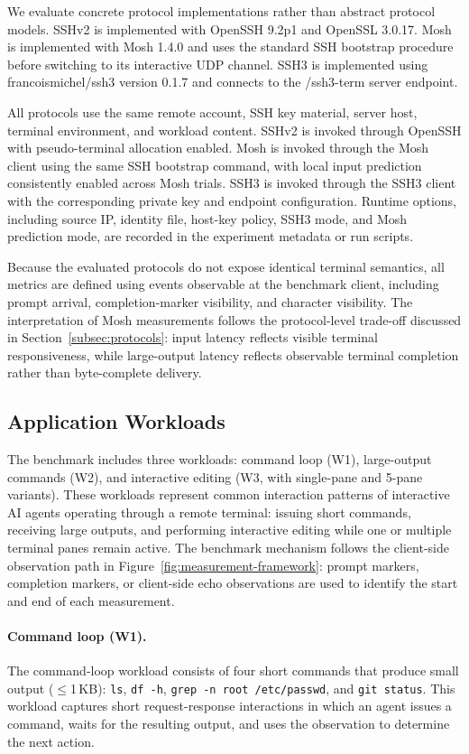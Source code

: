 We evaluate concrete protocol implementations rather than abstract protocol models. SSHv2 is implemented with OpenSSH 9.2p1 and OpenSSL 3.0.17. Mosh is implemented with Mosh 1.4.0 and uses the standard SSH bootstrap procedure before switching to its interactive UDP channel. SSH3 is implemented using francoismichel/ssh3 version 0.1.7 and connects to the /ssh3-term server endpoint.

All protocols use the same remote account, SSH key material, server host, terminal environment, and workload content. SSHv2 is invoked through OpenSSH with pseudo-terminal allocation enabled. Mosh is invoked through the Mosh client using the same SSH bootstrap command, with local input prediction consistently enabled across Mosh trials. SSH3 is invoked through the SSH3 client with the corresponding private key and endpoint configuration. Runtime options, including source IP, identity file, host-key policy, SSH3 mode, and Mosh prediction mode, are recorded in the experiment metadata or run scripts.

Because the evaluated protocols do not expose identical terminal semantics, all metrics are defined using events observable at the benchmark client, including prompt arrival, completion-marker visibility, and character visibility. The interpretation of Mosh measurements follows the protocol-level trade-off discussed in Section~\ref{subsec:protocols}: input latency reflects visible terminal responsiveness, while large-output latency reflects observable terminal completion rather than byte-complete delivery.

\subsection{Application Workloads}
\label{subsec:application-workloads}

The benchmark includes three workloads: command loop (W1), large-output commands (W2), and interactive editing (W3, with single-pane and 5-pane variants). These workloads represent common interaction patterns of interactive AI agents operating through a remote terminal: issuing short commands, receiving large outputs, and performing interactive editing while one or multiple terminal panes remain active. The benchmark mechanism follows the client-side observation path in Figure~\ref{fig:measurement-framework}: prompt markers, completion markers, or client-side echo observations are used to identify the start and end of each measurement.

\paragraph{Command loop (W1).}
The command-loop workload consists of four short commands that produce small output ($\leq$1\,KB): \texttt{ls}, \texttt{df~-h}, \texttt{grep~-n~root~/etc/passwd}, and \texttt{git~status}. This workload captures short request-response interactions in which an agent issues a command, waits for the resulting output, and uses the observation to determine the next action.

